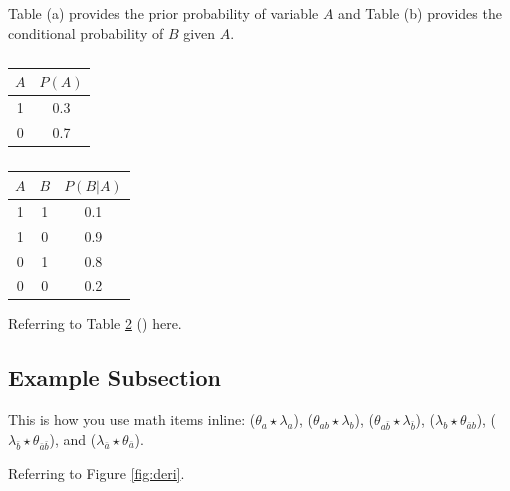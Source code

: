 \documentclass[UTF8]{ctexart}
\begin{document}
\begin{table}[!htb]

    \caption{Table (a) provides the prior probability of variable $A$ and Table (b) provides the conditional probability of $B$ given $A$.}
    \begin{subtable}{.5\linewidth}
      \centering
        \caption{}
        \begin{tabular}{c|c}
            $A$ & $P(A)$ \\ \hline
            1 & 0.3 \\
            0 & 0.7
        \end{tabular}
        \label{sub_table}
    \end{subtable}%
    \begin{subtable}{.5\linewidth}
      \centering
        \caption{}
        \begin{tabular}{cc|c}
            $A$ & $B$ & $P(B|A)$ \\ \hline
            1 & 1 & 0.1 \\
            1 & 0 & 0.9 \\
            0 & 1 & 0.8 \\
            0 & 0 & 0.2 \\
        \end{tabular}
    \end{subtable} 
        \label{subtb:pa}
\end{table}

Referring to Table \ref{subtb:pa} () here.

\subsection{Example Subsection}

This is how you use math items inline: 
($\theta_a \star \lambda_a$), 
($\theta_{ab} \star \lambda_{{b}}$), 
($\theta_{a{\bar b}} \star \lambda_{{\bar b}}$),
($\lambda_{{b}} \star \theta_{{\bar a}b}$),
($\lambda_{{\bar b}} \star \theta_{{\bar a}\bar{b}}$), and
($\lambda_{{\bar a}} \star \theta_{{\bar a}}$).


Referring to Figure \ref{fig:deri}. 
\end{document}
